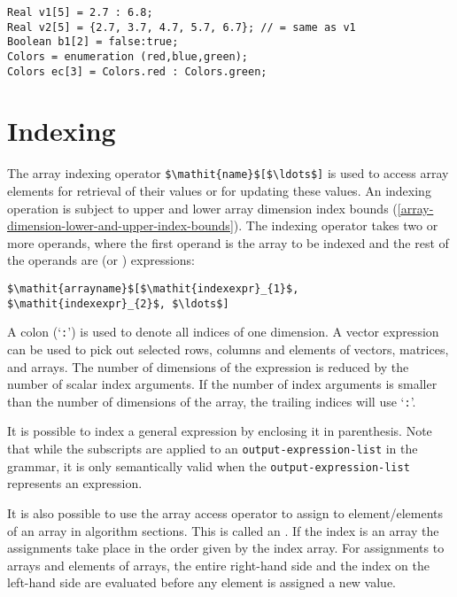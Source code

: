 \begin{example}
\begin{lstlisting}[language=modelica]
Real v1[5] = 2.7 : 6.8;
Real v2[5] = {2.7, 3.7, 4.7, 5.7, 6.7}; // = same as v1
Boolean b1[2] = false:true;
Colors = enumeration (red,blue,green);
Colors ec[3] = Colors.red : Colors.green;
\end{lstlisting}
\end{example}

\section{Indexing}\label{array-indexing}\label{indexing}

The array indexing operator \lstinline!$\mathit{name}$[$\ldots$]! is used to access array elements for retrieval of their values or for updating these values.
An indexing operation is subject to upper and lower array dimension index bounds (\cref{array-dimension-lower-and-upper-index-bounds}).
The indexing operator takes two or more operands, where the first operand is the array to be indexed and the rest of the operands are  (or ) expressions:

\lstinline!$\mathit{arrayname}$[$\mathit{indexexpr}_{1}$, $\mathit{indexexpr}_{2}$, $\ldots$]!

A colon (`\lstinline!:!') is used to denote all indices of one dimension.
A vector expression can be used to pick out selected rows, columns and elements of vectors, matrices, and arrays.
The number of dimensions of the expression is reduced by the number of scalar index arguments.
If the number of index arguments is smaller than the number of dimensions of the array, the trailing indices will use `\lstinline!:!'.

It is possible to index a general expression by enclosing it in parenthesis.
Note that while the subscripts are applied to an \lstinline[language=grammar]!output-expression-list! in the grammar, it is only semantically valid when the \lstinline[language=grammar]!output-expression-list! represents an expression.

It is also possible to use the array access operator to assign to element/elements of an array in algorithm sections.
This is called an .
If the index is an array the assignments take place in the order given by the index array.
For assignments to arrays and elements of arrays, the entire right-hand side and the index on the left-hand side are evaluated before any element is assigned a new value.

